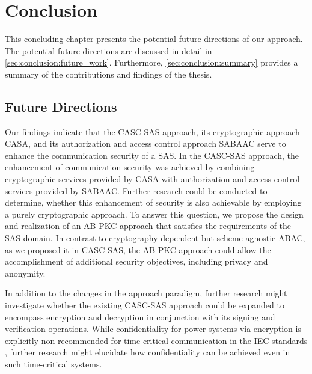 \chapter{Conclusion}
\label{ch:conclusion}
This concluding chapter presents the potential future directions of our approach.
The potential future directions are discussed in detail in \autoref{sec:conclusion:future_work}.
Furthermore, \autoref{sec:conclusion:summary} provides a summary of the contributions and findings of the thesis.

\section{Future Directions}
\label{sec:conclusion:future_work}
Our findings indicate that the CASC-SAS approach, its cryptographic approach CASA, and its authorization and access control approach SABAAC serve to enhance the communication security of a SAS.
In the CASC-SAS approach, the enhancement of communication security was achieved by combining cryptographic services provided by CASA with authorization and access control services provided by SABAAC.
Further research could be conducted to determine, whether this enhancement of security is also achievable by employing a purely cryptographic approach.
To answer this question, we propose the design and realization of an AB-PKC approach that satisfies the requirements of the SAS domain.
In contrast to cryptography-dependent but scheme-agnostic ABAC, as we proposed it in CASC-SAS, the AB-PKC approach could allow the accomplishment of additional security objectives, including privacy and anonymity.

In addition to the changes in the approach paradigm, further research might investigate whether the existing CASC-SAS approach could be expanded to encompass encryption and decryption in conjunction with its signing and verification operations.
While confidentiality for power systems via encryption is explicitly non-recommended for time-critical communication in the IEC standards \cite{IEC62351P6}, further research might elucidate how confidentiality can be achieved even in such time-critical systems.

